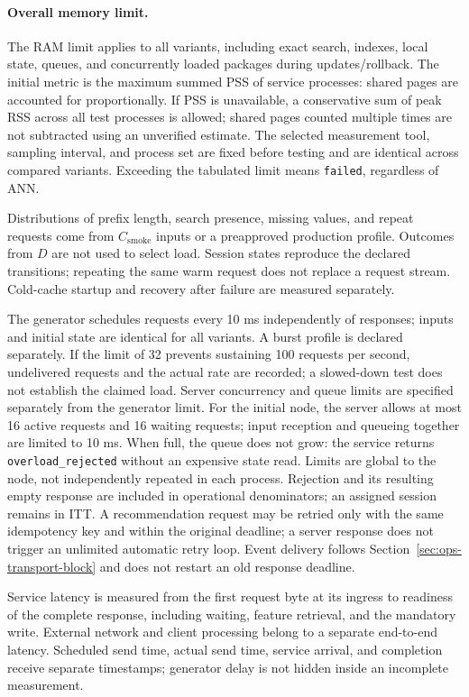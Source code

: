 \documentclass[12pt,a4paper]{article}
\newcommand{\code}[1]{{\ttfamily\small\nolinkurl{#1}}}
\theoremstyle{plainru}
\begin{document}
\paragraph{Overall memory limit.}\label{sec:ops-memory-limit}
The RAM limit applies to all variants, including exact search,
indexes, local state, queues, and concurrently loaded packages
during updates/rollback. The initial metric is the maximum summed PSS of service
processes: shared pages are accounted for proportionally.
If PSS is unavailable, a conservative sum of peak RSS across
all test processes is allowed; shared pages counted multiple times are not subtracted
using an unverified estimate. The selected measurement tool, sampling interval, and
process set are fixed before testing and are identical across compared
variants. Exceeding the tabulated limit means \code{failed}, regardless of ANN.

Distributions of prefix length, search presence, missing values, and repeat
requests come from $C_{\mathrm{smoke}}$ inputs or a preapproved
production profile. Outcomes from $D$ are not used to select load.
Session states reproduce the declared transitions;
repeating the same warm request does not replace a request stream.
Cold-cache startup and recovery after failure are measured separately.

The generator schedules requests every 10 ms independently of responses;
inputs and initial state are identical for all variants.
A burst profile is declared separately. If the limit of 32 prevents sustaining
100 requests per second, undelivered requests and the actual
rate are recorded; a slowed-down test does not establish the claimed load.
Server concurrency and queue limits are specified separately from the generator limit.
For the initial node, the server allows at most 16 active requests
and 16 waiting requests; input reception and queueing together are limited to 10 ms.
When full, the queue does not grow: the service returns
\code{overload_rejected} without an expensive state read.
Limits are global to the node, not independently repeated in each
process. Rejection and its resulting empty response are included
in operational denominators; an assigned session remains in ITT.
A recommendation request may be retried only with the same idempotency key
and within the original deadline; a server response does not trigger
an unlimited automatic retry loop. Event delivery follows
Section~\ref{sec:ops-transport-block} and does not restart an old response deadline.

Service latency is measured from the first request byte at its ingress
to readiness of the complete response, including waiting, feature retrieval,
and the mandatory write. External network and client processing belong
to a separate end-to-end latency. Scheduled send time,
actual send time, service arrival, and completion receive
separate timestamps; generator delay is not hidden
inside an incomplete measurement.
\end{document}
